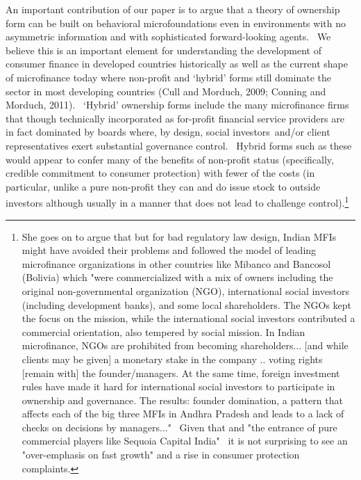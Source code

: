 \documentclass[11pt]{article}%
\begin{document}
An important contribution of our paper is to argue that a theory of ownership
form can be built on behavioral microfoundations even in environments with no
asymmetric information and with sophisticated forward-looking agents. \ We
believe this is an important element for understanding the development of
consumer finance in developed countries historically as well as the current
shape of microfinance today where non-profit and `hybrid' forms still dominate
the sector in most developing countries (Cull and Morduch, 2009; Conning and
Morduch, 2011). \ `Hybrid' ownership forms include the many microfinance firms
that though technically incorporated as for-profit financial service providers
are in fact dominated by boards where, by design, social investors\ and/or
client representatives exert substantial governance control. \ Hybrid forms
such as these would appear to confer many of the benefits of non-profit status
(specifically, credible commitment to consumer protection) with fewer of the
costs (in particular, unlike a pure non-profit they can and do issue stock to
outside investors although usually in a manner that does not lead to challenge
control).\footnote{%
She goes on to argue that but for bad regulatory law
design, Indian MFIs might have avoided their problems and followed the model
of leading microfinance organizations in other countries like Mibanco and
Bancosol (Bolivia) which "were commercialized with a mix of owners including
the original non-governmental organization (NGO), international social
investors (including development banks), and some local shareholders. The NGOs
kept the focus on the mission, while the international social investors
contributed a commercial orientation, also tempered by social mission. In
Indian microfinance, NGOs are prohibited from becoming shareholders... [and
while clients may be given] a monetary stake in the company .. voting rights
[remain with] the founder/managers. At the same time, foreign investment rules
have made it hard for international social investors to participate in
ownership and governance. The results: founder domination, a pattern that
affects each of the big three MFIs in Andhra Pradesh and leads to a lack of
checks on decisions by managers..." \ Given that and "the entrance of pure
commercial players like Sequoia Capital India" \ it is not surprising to see
an "over-emphasis on fast growth" and a rise in consumer protection
complaints.}
\end{document}

